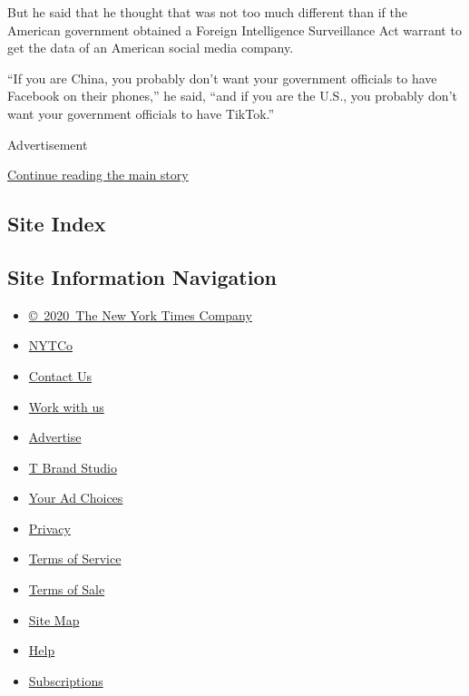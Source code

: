 But he said that he thought that was not too much different than if the
American government obtained a Foreign Intelligence Surveillance Act
warrant to get the data of an American social media company.

``If you are China, you probably don't want your government officials to
have Facebook on their phones,'' he said, ``and if you are the U.S., you
probably don't want your government officials to have TikTok.''

Advertisement

\protect\hyperlink{after-bottom}{Continue reading the main story}

\hypertarget{site-index}{%
\subsection{Site Index}\label{site-index}}

\hypertarget{site-information-navigation}{%
\subsection{Site Information
Navigation}\label{site-information-navigation}}

\begin{itemize}
\tightlist
\item
  \href{https://help.nytimes3xbfgragh.onion/hc/en-us/articles/115014792127-Copyright-notice}{©~2020~The
  New York Times Company}
\end{itemize}

\begin{itemize}
\tightlist
\item
  \href{https://www.nytco.com/}{NYTCo}
\item
  \href{https://help.nytimes3xbfgragh.onion/hc/en-us/articles/115015385887-Contact-Us}{Contact
  Us}
\item
  \href{https://www.nytco.com/careers/}{Work with us}
\item
  \href{https://nytmediakit.com/}{Advertise}
\item
  \href{http://www.tbrandstudio.com/}{T Brand Studio}
\item
  \href{https://www.nytimes3xbfgragh.onion/privacy/cookie-policy\#how-do-i-manage-trackers}{Your
  Ad Choices}
\item
  \href{https://www.nytimes3xbfgragh.onion/privacy}{Privacy}
\item
  \href{https://help.nytimes3xbfgragh.onion/hc/en-us/articles/115014893428-Terms-of-service}{Terms
  of Service}
\item
  \href{https://help.nytimes3xbfgragh.onion/hc/en-us/articles/115014893968-Terms-of-sale}{Terms
  of Sale}
\item
  \href{https://spiderbites.nytimes3xbfgragh.onion}{Site Map}
\item
  \href{https://help.nytimes3xbfgragh.onion/hc/en-us}{Help}
\item
  \href{https://www.nytimes3xbfgragh.onion/subscription?campaignId=37WXW}{Subscriptions}
\end{itemize}
